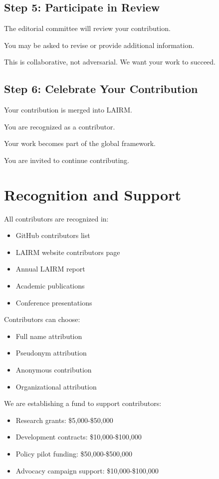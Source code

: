\documentclass[12pt,a4paper,twoside,openright]{book}
\begin{document}
\subsection{Step 5: Participate in Review}

The editorial committee will review your contribution.

You may be asked to revise or provide additional information.

This is collaborative, not adversarial. We want your work to succeed.

\subsection{Step 6: Celebrate Your Contribution}

Your contribution is merged into LAIRM.

You are recognized as a contributor.

Your work becomes part of the global framework.

You are invited to continue contributing.

\section{Recognition and Support}

All contributors are recognized in:
\begin{itemize}
    \item GitHub contributors list
    \item LAIRM website contributors page
    \item Annual LAIRM report
    \item Academic publications
    \item Conference presentations
\end{itemize}

Contributors can choose:
\begin{itemize}
    \item Full name attribution
    \item Pseudonym attribution
    \item Anonymous contribution
    \item Organizational attribution
\end{itemize}

We are establishing a fund to support contributors:
\begin{itemize}
    \item Research grants: \$5,000-\$50,000
    \item Development contracts: \$10,000-\$100,000
    \item Policy pilot funding: \$50,000-\$500,000
    \item Advocacy campaign support: \$10,000-\$100,000
\end{itemize}
\end{document}
